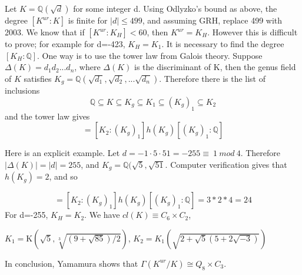 \documentclass[12pt]{extarticle}
\newcommand{\murgg}{\Gamma(K^{ur}/K)}
\newcommand{\Q}{\mathbb{Q}}
\newcommand{\<}{\langle}
\renewcommand{\>}{\rangle}
\theoremstyle{definition}
\begin{document}
Let $K=\Q(\sqrt{d})$ for some integer d. Using Odlyzko's bound as above, the degree $[K^{ur}:K]$ is finite for $|d|\leq 499$, and assuming GRH, replace 499 with 2003. We know that if $[K^{ur}:K_H]<60$, then $K^{ur}=K_H$. However this is difficult to prove; for example for d=-423, $K_H=K_1$. It is necessary to find the degree $[K_H:\Q]$. One way is to use the tower law from Galois theory. Suppose $\Delta(K)=d_1d_2...d_n$, where $\Delta(K)$ is the discriminant of K, then the genus field of $K$ satisfies $K_g=\Q(\sqrt{d_1},\sqrt{d_2},...\sqrt{d_n})$. Therefore there is the list of inclusions \begin{equation}
    \Q \subseteq K \subseteq K_g \subseteq K_1 \subseteq (K_g)_1 \subseteq K_2
\end{equation} and the tower law gives \begin{equation}
    [K_2:q] = [K_2:(K_g)_1]h(K_g)[(K_g)_1:\Q]
\end{equation}\par
Here is an explicit example. Let  $d=-1 \cdot 5 \cdot 51=-255\equiv \: 1\:mod\:4$. Therefore $|\Delta(K)|=|d|=255$, and $K_g = \Q(\sqrt{5},\sqrt{51}$. Computer verification gives that $h(K_g)=2$, and so 

\begin{equation}
     [K_2:\Q] = [K_2:(K_g)_1]h(K_g)[(K_g)_1:\Q]= 3*2*4=24
\end{equation}
For d=-255, $K_H=K_2$. We have $cl(K)\equiv C_6 \times C_2$, 

$K_1 = $K$ \left( 
\sqrt{5}, \sqrt[3]{(9+\sqrt{85})/2}
\right)$, $K_2 = K_1 \left( 
\sqrt{2+\sqrt{5}(5+2\sqrt{-3})}
\right)$

 In conclusion, Yamamura shows that $\murgg \cong Q_8 \times C_3$.
\end{document}
